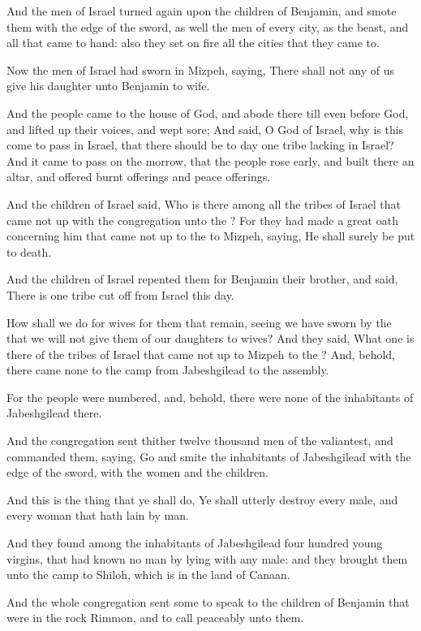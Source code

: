 \Verse And the men of Israel turned again upon the children of Benjamin, and smote them with the edge of the sword, as well the men of every city, as the beast, and all that came to hand: also they set on fire all the cities that they came to.


\Chapter
\Verse Now the men of Israel had sworn in Mizpeh, saying, There shall not any of us give his daughter unto Benjamin to wife.

\Verse And the people came to the house of God, and abode there till even before God, and lifted up their voices, and wept sore; \Verse And said, O \LORD God of Israel, why is this come to pass in Israel, that there should be to day one tribe lacking in Israel?  \Verse And it came to pass on the morrow, that the people rose early, and built there an altar, and offered burnt offerings and peace offerings.

\Verse And the children of Israel said, Who is there among all the tribes of Israel that came not up with the congregation unto the \LORD?  For they had made a great oath concerning him that came not up to the \LORD to Mizpeh, saying, He shall surely be put to death.

\Verse And the children of Israel repented them for Benjamin their brother, and said, There is one tribe cut off from Israel this day.

\Verse How shall we do for wives for them that remain, seeing we have sworn by the \LORD that we will not give them of our daughters to wives?  \Verse And they said, What one is there of the tribes of Israel that came not up to Mizpeh to the \LORD? And, behold, there came none to the camp from Jabeshgilead to the assembly.

\Verse For the people were numbered, and, behold, there were none of the inhabitants of Jabeshgilead there.

\Verse And the congregation sent thither twelve thousand men of the valiantest, and commanded them, saying, Go and smite the inhabitants of Jabeshgilead with the edge of the sword, with the women and the children.

\Verse And this is the thing that ye shall do, Ye shall utterly destroy every male, and every woman that hath lain by man.

\Verse And they found among the inhabitants of Jabeshgilead four hundred young virgins, that had known no man by lying with any male: and they brought them unto the camp to Shiloh, which is in the land of Canaan.

\Verse And the whole congregation sent some to speak to the children of Benjamin that were in the rock Rimmon, and to call peaceably unto them.

